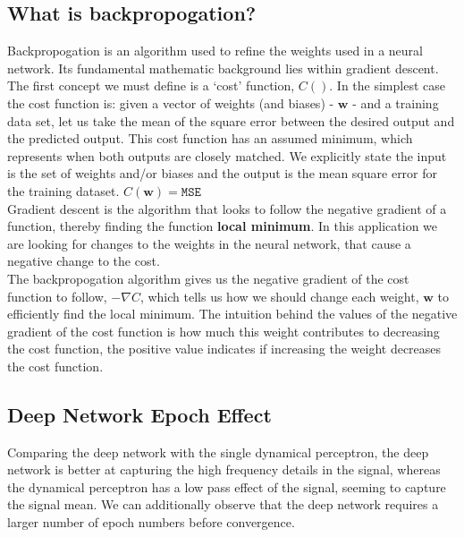 \documentclass[12pt]{article}
\numberwithin{equation}{section}
\def\vw{{\bm{w}}}
\begin{document}
	\subsection{What is backpropogation?} \label{sec: 4-6-backpropogation}
		Backpropogation is an algorithm used to refine the weights used in a neural network. Its fundamental mathematic background lies within gradient descent.\\
		The first concept we must define is a `cost' function, ${C}()$. In the simplest case the cost function is: given a vector of weights (and biases) - $\vw$ - and a training data set, let us take the mean of the square error between the desired output and the predicted output. This cost function has an assumed minimum, which represents when both outputs are closely matched. We explicitly state the input is the set of weights and/or biases and the output is the mean square error for the training dataset. ${C}(\vw)=\texttt{MSE}$\\
		Gradient descent is the algorithm that looks to follow the negative gradient of a function, thereby finding the function \textbf{local minimum}. In this application we are looking for changes to the weights in the neural network, that cause a negative change to the cost. \\
		The backpropogation algorithm gives us the negative gradient of the cost function to follow, $-\nabla{C}$, which tells us how we should change each weight, $\vw$ to efficiently find the local minimum. The intuition behind the values of the negative gradient of the cost function is how much this weight contributes to decreasing the cost function, the positive value indicates if increasing the weight decreases the cost function.
		
	\subsection{Deep Network Epoch Effect} \label{sec: 4-7-DL-epoch}
		Comparing the deep network with the single dynamical perceptron, the deep network is better at capturing the high frequency details in the signal, whereas the dynamical perceptron has a low pass effect of the signal, seeming to capture the signal mean. We can additionally observe that the deep network requires a larger number of epoch numbers before convergence.
		
\end{document}
